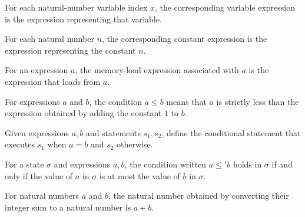 \begin{definition}
\label{Light.v}
\leanok
{}
For each natural-number variable index $x$, the corresponding variable expression is the
expression representing that variable.
\end{definition}

\begin{definition}
\label{Light.k}
\leanok
{}
For each natural number $n$, the corresponding constant expression is the expression
representing the constant $n$.
\end{definition}

\begin{definition}
\label{Light.M}
\leanok
{}
For an expression $a$, the memory-load expression associated with $a$ is the expression
that loads from $a$.
\end{definition}

\begin{definition}
\label{Light.Cond.le}
\leanok
{}
For expressions $a$ and $b$, the condition $a \le b$ means that $a$ is strictly less
than the expression obtained by adding the constant $1$ to $b$.
\end{definition}

\begin{definition}
\label{Light.Stmt.iteNe}
\leanok
{}
Given expressions $a,b$ and statements $s_1,s_2$, define the conditional statement that
executes $s_1$ when $a=b$ and $s_2$ otherwise.
\end{definition}

\begin{theorem}
\label{Light.Cond.holds_le}
\leanok
{}
For a state $\sigma$ and expressions $a,b$, the condition written $a\le' b$ holds in
$\sigma$ if and only if the value of $a$ in $\sigma$ is at most the value of $b$ in
$\sigma$.
\end{theorem}

\begin{theorem}
\label{Light.toNat_natCast_add_natCast}
\leanok
{}
For natural numbers $a$ and $b$, the natural number obtained by converting their integer
sum to a natural number is $a+b$.
\end{theorem}

